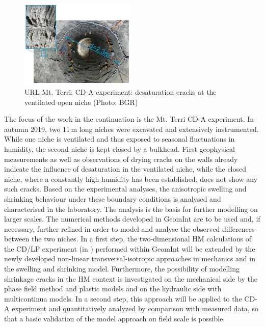 \begin{figure}
\vspace{-5mm}
\centering
\includegraphics[width=0.49\textwidth]{figures/CDA_open_niche}
\caption{URL Mt. Terri: CD-A experiment: desaturation cracks at the ventilated open niche (Photo: BGR)}
\label{fig:cd-a}
\end{figure}
The focus of the work in the continuation is the Mt. Terri CD-A experiment. In autumn 2019, two 11\,m long niches were excavated and extensively instrumented. While one niche is ventilated and thus exposed to seasonal fluctuations in humidity, the second niche is kept closed by a bulkhead. First geophysical measurements as well as observations of drying cracks on the walls already indicate the influence of desaturation in the ventilated niche, while the closed niche, where a constantly high humidity has been established, does not show any such cracks. Based on the experimental analyses, the anisotropic swelling and shrinking behaviour under these boundary conditions is analysed and characterised in the laboratory. The analysis is the basis for further modelling on larger scales. 
The numerical methods \cite{Yoshioka2019,Parisio2019102} developed in GeomInt are to be used and, if necessary, further refined in order to model and analyse the observed differences between the two niches. In a first step, the two-dimensional HM calculations of the CD/LP experiment (in \cite{Kolditz2020b}) performed within GeomInt will be extended by the newly developed non-linear transversal-isotropic approaches in mechanics and in the swelling and shrinking model. Furthermore, the possibility of modelling shrinkage cracks in the HM context is investigated on the mechanical side by the phase field method and plastic models and on the hydraulic side with multicontinua models. In a second step, this approach will be applied to the CD-A experiment and quantitatively analyzed by comparison with measured data, so that a basic validation of the model approach on field scale is possible. 


